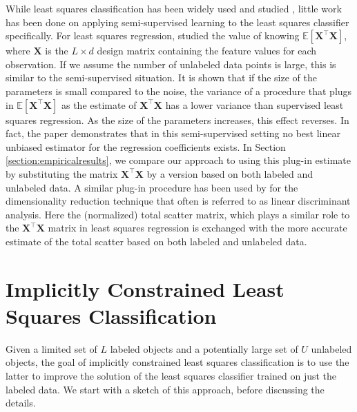 \documentclass{llncs}
\newcommand{\featdim}{d}
\newcommand{\Nunl}{U}
\newcommand{\Nlab}{L}
\begin{document}
While least squares classification has been widely used and studied \cite{Poggio, Hastie, Suykens}, little work has been done on applying semi-supervised learning to the least squares classifier specifically. For least squares regression, \cite{Shaffer1991} studied the value of knowing $\mathbb{E}[\mathbf{X}^\top\mathbf{X}]$, where $\mathbf{X}$ is the $\Nlab \times \featdim$ design matrix containing the feature values for each observation. If we assume the number of unlabeled data points is large, this is similar to the semi-supervised situation. It is shown that if the size of the parameters is small compared to the noise, the variance of a procedure that plugs in $\mathbb{E}[\mathbf{X}^\top\mathbf{X}]$ as the estimate of $\mathbf{X}^\top\mathbf{X}$ has a lower variance than supervised least squares regression.  As the size of the parameters increases, this effect reverses. In fact, the paper demonstrates that in this semi-supervised setting no best linear unbiased estimator for the regression coefficients exists. In Section \ref{section:empiricalresults}, we compare our approach to using this plug-in estimate by substituting the matrix $\mathbf{X}^\top\mathbf{X}$ by a version based on both labeled and unlabeled data. 
A similar plug-in procedure has been used by \cite{Fan2008} for the dimensionality reduction technique that often is referred to as linear discriminant analysis. Here the (normalized) total scatter matrix, which plays a similar role to the $\mathbf{X}^\top\mathbf{X}$ matrix in least squares regression is exchanged with the more accurate estimate of the total scatter based on both labeled and unlabeled data.

\section{Implicitly Constrained Least Squares Classification}

Given a limited set of $\Nlab$ labeled objects and a potentially large set of $\Nunl$ unlabeled objects, the goal of implicitly constrained least squares classification is to use the latter to improve the solution of the least squares classifier trained on just the labeled data. We start with a sketch of this approach, before discussing the details.
\end{document}
